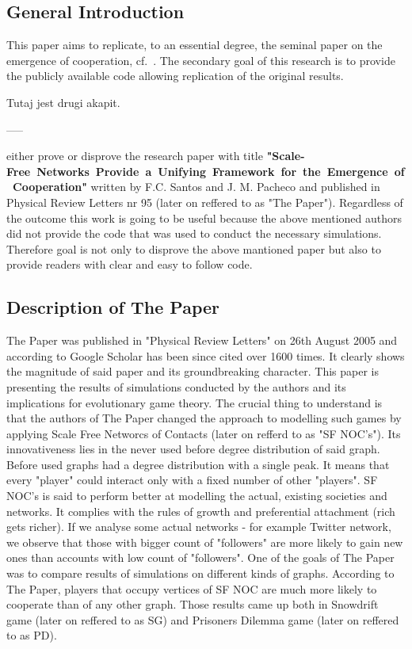 \documentclass[english, twoside, 12pt, a4paper]{article}
\theoremstyle{definition}
\theoremstyle{plain}
\theoremstyle{remark}
\begin{document}
\subsection{General Introduction}

This paper aims to replicate, to an essential degree, the seminal paper on the emergence of cooperation, cf.~\cite{santos2005scale}. The secondary goal of this research is to provide the publicly available code allowing replication of the original results.

Tutaj jest drugi akapit. 

-----

either prove or disprove the research paper with title \mbox{\textbf{"Scale-Free Networks Provide a Unifying Framework for the Emergence of Cooperation"}}
 written by F.C. Santos and J. M. Pacheco and published in Physical Review Letters nr 95 (later on reffered to as "The Paper"). Regardless of the outcome this work is going to be useful
 because the above mentioned authors did not provide the code that was used to conduct the necessary simulations. Therefore goal is not only
 to disprove the above mantioned paper but also to provide readers with clear and easy to follow code. 
 
 \subsection{Description of The Paper}

The Paper was published in "Physical Review Letters" on 26th August 2005 and according to Google Scholar has been since cited over 1600 times. 
It clearly shows the magnitude of said paper and its groundbreaking character. This paper is presenting the results of simulations conducted by the authors and its 
implications for evolutionary game theory. The crucial thing to understand is that the authors of The Paper changed the approach to modelling such games by applying
Scale Free Networcs of Contacts (later on refferd to as "SF NOC's"). Its innovativeness lies in the never used before degree distribution of said graph. Before used
graphs had a degree distribution with a single peak. It means that every "player" could interact only with a fixed number of other "players". SF NOC's is said to 
perform better at modelling the actual, existing societies and networks. It complies with the rules of growth and preferential attachment (rich gets richer). If we 
analyse some actual networks - for example Twitter network, we observe that those with bigger count of "followers" are more likely to gain new ones than accounts 
with low count of "followers". One of the goals of The Paper was to compare results of simulations on different kinds of graphs. According to The Paper, players that 
occupy vertices of SF NOC are much more likely to cooperate than of any other graph. Those results came up both in Snowdrift game (later on reffered to as SG) and 
Prisoners Dilemma game (later on reffered to as PD). 
\end{document}
